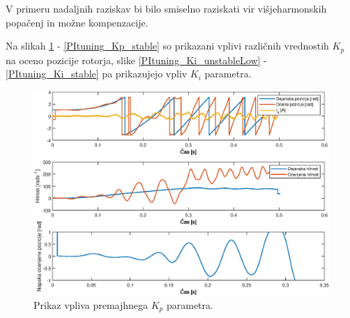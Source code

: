 \documentclass[a4paper,twoside,openright,12pt,slovene]{book}
\begin{document}
V primeru nadaljnih raziskav bi bilo smiselno raziskati vir višjeharmonskih popačenj in možne kompenzacije.

\cleardoublepage{} %





\appendix

Na slikah \ref{PItuning_Kp_unstableLow} - \ref{PItuning_Kp_stable} so prikazani vplivi različnih vrednostih $K_p$ na oceno pozicije rotorja, slike \ref{PItuning_Ki_unstableLow} -
\ref{PItuning_Ki_stable} pa prikazujejo vpliv $K_i$ parametra.

\begin{figure}[!htbp]
    \centering
    \includegraphics[width=1\columnwidth]{Slike/PItuning_Kp_unstableLow.eps}
    \caption{\label{PItuning_Kp_unstableLow} Prikaz vpliva premajhnega $K_p$ parametra. }
\end{figure}
\end{document}
